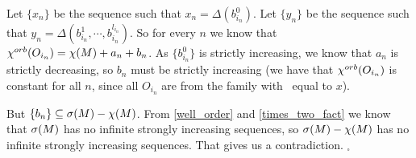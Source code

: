 Let $\{x_n\}$ be the sequence such that $x_n = \Delta(b^0_{i_n})$.
Let $\{y_n\}$ be the sequence such that $y_n = \Delta(b^1_{i_n},
\cdots, b^{l_{i_n}}_{i_n})$. 
So for every $n$ we know that ${\chi^{orb}(O_{i_n})} = \chi(M) + a_n + b_n$. As $\{b^0_{i_n}\}$ 
is strictly 
increasing, we know 
that $a_n$ is strictly decreasing, so $b_n$ must be strictly 
increasing  
(we have that ${\chi^{orb}(O_{i_n})}$ is constant for all $n$, since all $O_{i_n}$ 
are from the family with \Eoc\ equal to $x$). 

But $\{b_n\} \subseteq {{\sigma}(M)} - \chi(M)$. 
From \ref{well_order} and \ref{times_two_fact} we know that ${{\sigma}(M)}$ has no infinite 
strongly increasing sequences, so 
${{\sigma}(M)} - \chi(M)$ has no infinite strongly increasing sequences. That gives us a 
contradiction. 
$_\square$ 



